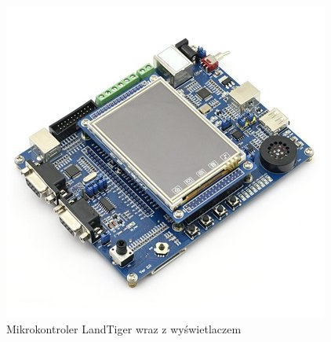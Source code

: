 \documentclass{BscUS}
\begin{document}
\begin{figure}[h]
\centering
\includegraphics{./img/landTiger}
\caption{Mikrokontroler LandTiger wraz z wyświetlaczem}
\end{figure}
\end{document}
